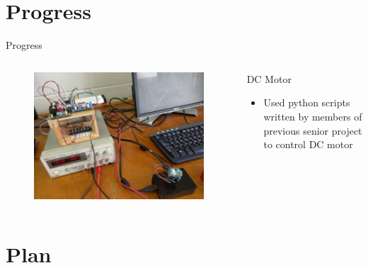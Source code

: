 \documentclass{beamer}
\begin{document}
\section{Progress}

\begin{frame}{Progress}
	\begin{columns}[T]
		\begin{column}{0.5\textwidth}
			\begin{figure}
				\includegraphics[scale=0.04]{figs/motorSetup.jpg}
			\end{figure}						
		\end{column}
		\begin{column}{0.5\textwidth}
			\begin{block}{DC Motor}
				\begin{itemize}
					\item Used python scripts written by members of previous senior project to control DC motor
				\end{itemize}
			\end{block}
		\end{column}
	\end{columns}
\end{frame}

\section{Plan}
\end{document}
